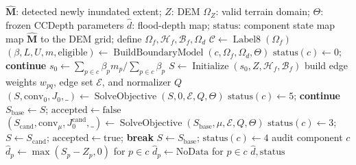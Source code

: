 \begin{algorithm}[htbp]
\footnotesize
\caption{CCDepth: Change-Constrained Flood Depth Estimation}
\label{alg:ccdepth}
\begin{algorithmic}[1]
\Require \(\hat{\mathbf M}\): detected newly inundated extent; \(Z\): DEM
\Require \(\Omega_Z\): valid terrain domain; \(\Theta\): frozen CCDepth parameters
\Ensure \(\hat d\): flood-depth map; \(\mathrm{status}\): component state map
  \State map \(\hat{\mathbf M}\) to the DEM grid; define \(\Omega_f,\mathcal H_f,\mathcal B_f,\Omega_d\)
  \State \(\mathcal C\leftarrow\operatorname{Label8}(\Omega_f)\)
    \State \((\beta,L,U,m,\mathrm{eligible})\leftarrow\operatorname{BuildBoundaryModel}(c,\Omega_f,\Omega_d,\Theta)\)
      \State \(\mathrm{status}(c)\leftarrow0\); \textbf{continue}
    \EndIf
    \State \(s_0\leftarrow\sum_{p\in c}\beta_pm_p/\sum_{p\in c}\beta_p\)
    \State \(S\leftarrow\operatorname{Initialize}(s_0,Z,\mathcal H_f,\mathcal B_f)\)
    \State build edge weights \(w_{pq}\), edge set \(\mathcal E\), and normalizer \(Q\)
    \State \((S,\mathrm{conv}_0,J_0,\_)\leftarrow\operatorname{SolveObjective}(S,0,\mathcal E,Q,\Theta)\)
      \State \(\mathrm{status}(c)\leftarrow5\); \textbf{continue}
    \EndIf
    \State \(S_{\mathrm{base}}\leftarrow S\); \(\mathrm{accepted}\leftarrow\mathrm{false}\)
      \State \((S_{\mathrm{cand}},\mathrm{conv}_\mu,J_0^{\mathrm{cand}},\_)\leftarrow\operatorname{SolveObjective}(S_{\mathrm{base}},\mu,\mathcal E,Q,\Theta)\)
        \State \(\mathrm{status}(c)\leftarrow3\); \(S\leftarrow S_{\mathrm{cand}}\); \(\mathrm{accepted}\leftarrow\mathrm{true}\); \textbf{break}
      \EndIf
    \EndFor
      \State \(S\leftarrow S_{\mathrm{base}}\); \(\mathrm{status}(c)\leftarrow4\)
    \EndIf
    \State audit component \(c\)
      \State \(\hat d_p\leftarrow\max(S_p-Z_p,0)\) for \(p\in c\)
    \Else
      \State \(\hat d_p\leftarrow\mathrm{NoData}\) for \(p\in c\)
    \EndIf
  \EndFor
  \State \Return \(\hat d,\mathrm{status}\)
\EndProcedure
\end{algorithmic}
\end{algorithm}
